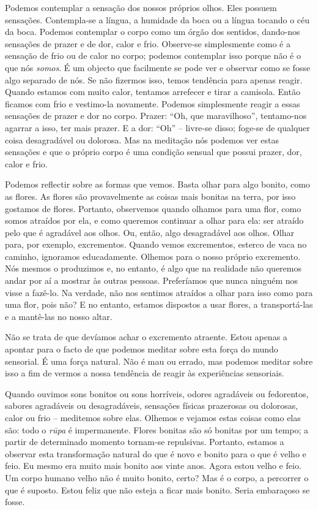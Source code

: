 Podemos contemplar a sensação dos nossos próprios olhos. Eles possuem sensações.
Contempla-se a língua, a humidade da boca ou a língua tocando o céu da boca.
Podemos contemplar o corpo como um órgão dos sentidos, dando-nos sensações de
prazer e de dor, calor e frio. Observe-se simplesmente como é a sensação de frio
ou de calor no corpo; podemos contemplar isso porque não é o que nós
\emph{somos}. É um objecto que facilmente se pode ver e observar como se fosse
algo separado de nós. Se não fizermos isso, temos tendência para apenas reagir.
Quando estamos com muito calor, tentamos arrefecer e tirar a camisola. Então
ficamos com frio e vestimo-la novamente. Podemos simplesmente reagir a essas
sensações de prazer e dor no corpo. Prazer: ``Oh, que maravilhoso'', tentamo-nos
agarrar a isso, ter mais prazer. E a dor: ``Oh'' -- livre-se disso; foge-se de
qualquer coisa desagradável ou dolorosa. Mas na meditação nós podemos ver estas
sensações e que o próprio corpo é uma condição sensual que possui prazer, dor,
calor e frio.

Podemos reflectir sobre as formas que vemos. Basta olhar para algo bonito, como
as flores. As flores são provavelmente as coisas mais bonitas na terra, por isso
gostamos de flores. Portanto, observemos quando olhamos para uma flor, como
somos atraídos por ela, e como queremos continuar a olhar para ela: ser atraído
pelo que é agradável aos olhos. Ou, então, algo desagradável aos olhos. Olhar
para, por exemplo, excrementos. Quando vemos excrementos, esterco de vaca no
caminho, ignoramos educadamente. Olhemos para o nosso próprio excremento. Nós
mesmos o produzimos e, no entanto, é algo que na realidade não queremos andar
por aí a mostrar às outras pessoas. Preferíamos que nunca ninguém nos visse a
fazê-lo. Na verdade, não nos sentimos atraídos a olhar para isso como para uma
flor, pois não? E no entanto, estamos dispostos a usar flores, a transportá-las
e a mantê-las no nosso altar.

Não se trata de que devíamos achar o excremento atraente. Estou apenas a apontar
para o facto de que podemos meditar sobre esta força do mundo sensorial. É uma
força natural. Não é mau ou errado, mas podemos meditar sobre isso a fim de
vermos a nossa tendência de reagir às experiências sensoriais.

Quando ouvimos sons bonitos ou sons horríveis, odores agradáveis ou fedorentos,
sabores agradáveis ou desagradáveis, sensações físicas prazerosas ou dolorosas,
calor ou frio -- meditemos sobre elas. Olhemos e vejamos estas coisas como elas
são: todo o \emph{rūpa} é impermanente. Flores bonitas são só bonitas por um
tempo; a partir de determinado momento tornam-se repulsivas. Portanto, estamos a
observar esta transformação natural do que é novo e bonito para o que é velho e
feio. Eu mesmo era muito mais bonito aos vinte anos. Agora estou velho e feio.
Um corpo humano velho não é muito bonito, certo? Mas é o corpo, a percorrer o
que é suposto. Estou feliz que não esteja a ficar mais bonito. Seria embaraçoso
se fosse.

